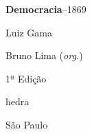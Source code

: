 




\begingroup\thispagestyle{empty}\vspace*{.05\textheight}\parindent=0pt 
              \formular
              \Huge 
              \textbf{Democracia}–1869    
              \bigskip

              \Large
              Luiz Gama
              \normalsize
              \vspace{3em}

              \small
              Bruno Lima (\textit{org.})
              \vspace{6em}

   					  1ª Edição
                      

              \vfill

              \newfontfamily{}
              {\fontsize{30}{40}\selectfont \timesnewroman hedra}
              \smallskip

              \small
              São Paulo \the\year
\endgroup
\pagebreak
